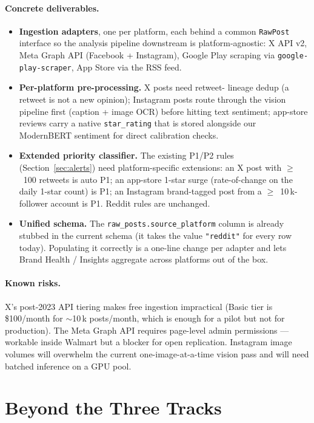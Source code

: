 \paragraph{Concrete deliverables.}
\begin{itemize}
\item \textbf{Ingestion adapters}, one per platform, each behind a
      common \texttt{RawPost} interface so the analysis pipeline
      downstream is platform-agnostic: X API v2, Meta Graph API
      (Facebook + Instagram), Google Play scraping via
      \texttt{google-play-scraper}, App Store via the RSS feed.
\item \textbf{Per-platform pre-processing.}  X posts need retweet-
      lineage dedup (a retweet is not a new opinion); Instagram
      posts route through the vision pipeline first (caption + image
      OCR) before hitting text sentiment; app-store reviews carry a
      native \texttt{star\_rating} that is stored alongside our
      ModernBERT sentiment for direct calibration checks.
\item \textbf{Extended priority classifier.}  The existing P1/P2 rules
      (Section~\ref{sec:alerts}) need platform-specific extensions:
      an X post with $\geq$~100 retweets is auto P1; an app-store
      1-star surge (rate-of-change on the daily 1-star count) is P1;
      an Instagram brand-tagged post from a $\geq$~10\,k-follower
      account is P1.  Reddit rules are unchanged.
\item \textbf{Unified schema.}  The
      \texttt{raw\_posts.source\_platform} column is already stubbed
      in the current schema (it takes the value \texttt{"reddit"}
      for every row today).  Populating it correctly is a one-line
      change per adapter and lets Brand Health / Insights aggregate
      across platforms out of the box.
\end{itemize}

\paragraph{Known risks.}
X's post-2023 API tiering makes free ingestion impractical (Basic
tier is \$100/month for $\sim$10\,k posts/month, which is enough for a
pilot but not for production).  The Meta Graph API requires
page-level admin permissions --- workable inside Walmart but a
blocker for open replication.  Instagram image volumes will
overwhelm the current one-image-at-a-time vision pass and will need
batched inference on a GPU pool.

\section{Beyond the Three Tracks}\label{sec:future:beyond}

